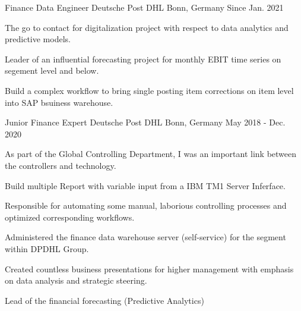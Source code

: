 

\begin{cventries}
\cventry
  {Finance Data Engineer} %
  {Deutsche Post DHL} %
  {Bonn, Germany} %
  {Since Jan. 2021} %
  {
    \begin{cvitems} %
      \item {The go to contact for digitalization project with respect to data analytics and predictive models.}
      \item {Leader of an influential forecasting project for monthly EBIT time series on segement level and below.}
      \item {Build a complex workflow to bring single posting item corrections on item level into SAP bsuiness warehouse.}
    \end{cvitems}
  }


\cventry
  {Junior Finance Expert} %
  {Deutsche Post DHL} %
  {Bonn, Germany} %
  {May 2018 - Dec. 2020} %
  {
    \begin{cvitems} %
      \item {As part of the Global Controlling Department, I was an important link between the controllers and technology.}
      \item {Build multiple Report with variable input from a IBM TM1 Server Inferface.}
      \item {Responsible for automating some manual, laborious controlling processes and optimized corresponding workflows.}
      \item {Administered the finance data warehouse server (self-service) for the segment within DPDHL Group.}
      \item {Created countless business presentations for higher management with emphasis on data analysis and strategic steering.}
      \item {Lead of the financial forecasting (Predictive Analytics)}
    \end{cvitems}
  }



\end{cventries}

